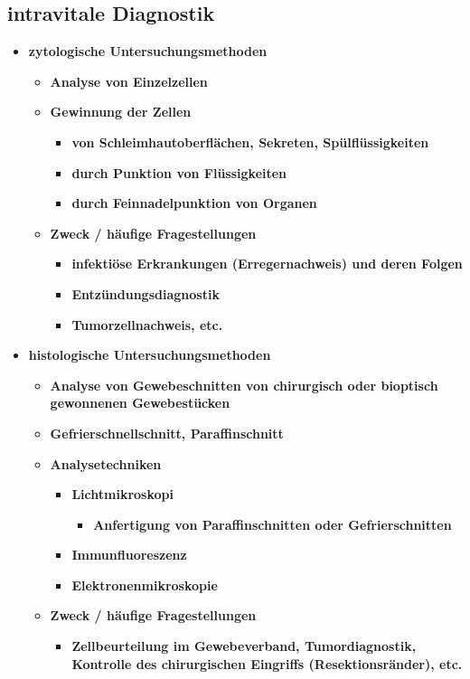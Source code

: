 \subsection{intravitale Diagnostik}
	\begin{itemize}
		\item \textbf{zytologische Untersuchungsmethoden}
			\begin{itemize}
				\item \textbf{Analyse von Einzelzellen}
				\item \textbf{Gewinnung der Zellen}
					\begin{itemize}
						\item \textbf{von Schleimhautoberflächen, Sekreten, Spülflüssigkeiten}
						\item \textbf{durch Punktion von Flüssigkeiten}
						\item \textbf{durch Feinnadelpunktion von Organen}
					\end{itemize}
				\item \textbf{Zweck / häufige Fragestellungen}
					\begin{itemize}
						\item \textbf{infektiöse Erkrankungen (Erregernachweis) und deren Folgen}
						\item \textbf{Entzündungsdiagnostik}
						\item \textbf{Tumorzellnachweis, etc.}
					\end{itemize}
			\end{itemize}
		\item \textbf{histologische Untersuchungsmethoden}
			\begin{itemize}
				\item \textbf{Analyse von Gewebeschnitten von chirurgisch oder bioptisch gewonnenen Gewebestücken}
				\item \textbf{Gefrierschnellschnitt, Paraffinschnitt}
				\item \textbf{Analysetechniken}
					\begin{itemize}
						\item \textbf{Lichtmikroskopi}
							\begin{itemize}
								\item \textbf{Anfertigung von Paraffinschnitten oder Gefrierschnitten}
							\end{itemize}
						\item \textbf{Immunfluoreszenz}
						\item \textbf{Elektronenmikroskopie}
					\end{itemize}
		\item \textbf{Zweck / häufige Fragestellungen}
			\begin{itemize}
				\item \textbf{Zellbeurteilung im Gewebeverband, Tumordiagnostik, Kontrolle des chirurgischen Eingriffs (Resektionsränder), etc.}
			\end{itemize}
		\end{itemize}
	\end{itemize}
	
